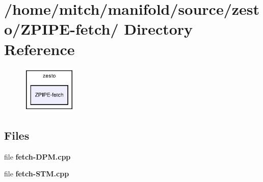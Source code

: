 \section{/home/mitch/manifold/source/zesto/ZPIPE-fetch/ Directory Reference}
\label{dir_66b24feecc5b171e50d074ec5d62a972}


\nopagebreak
\begin{figure}[H]
\begin{center}
\leavevmode
\includegraphics[width=73pt]{dir_66b24feecc5b171e50d074ec5d62a972_dep}
\end{center}
\end{figure}
\subsection*{Files}
\begin{CompactItemize}
\item 
file {\bf fetch-DPM.cpp}
\item 
file {\bf fetch-STM.cpp}
\end{CompactItemize}
